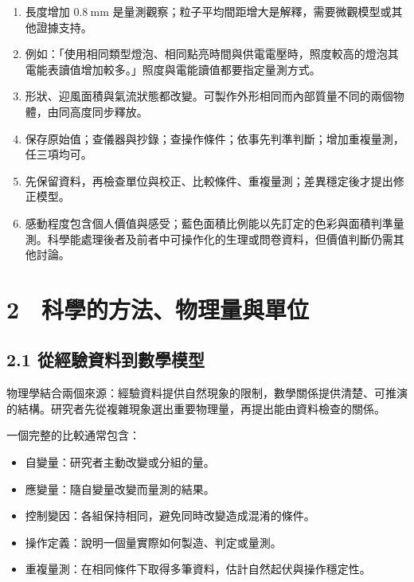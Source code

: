 \documentclass[11pt,a4paper]{article}
\providecommand{\tightlist}{%
  \setlength{\itemsep}{0pt}\setlength{\parskip}{0pt}}
\begin{document}
\begin{enumerate}
\def\labelenumi{\arabic{enumi}.}
\tightlist
\item
  長度增加 \(0.8\ \mathrm{mm}\) 是量測觀察；粒子平均間距增大是解釋，需要微觀模型或其他證據支持。
\item
  例如：「使用相同類型燈泡、相同點亮時間與供電電壓時，照度較高的燈泡其電能表讀值增加較多。」照度與電能讀值都要指定量測方式。
\item
  形狀、迎風面積與氣流狀態都改變。可製作外形相同而內部質量不同的兩個物體，由同高度同步釋放。
\item
  保存原始值；查儀器與抄錄；查操作條件；依事先判準判斷；增加重複量測，任三項均可。
\item
  先保留資料，再檢查單位與校正、比較條件、重複量測；差異穩定後才提出修正模型。
\item
  感動程度包含個人價值與感受；藍色面積比例能以先訂定的色彩與面積判準量測。科學能處理後者及前者中可操作化的生理或問卷資料，但價值判斷仍需其他討論。
\end{enumerate}

\section{2　科學的方法、物理量與單位}\label{ux79d1ux5b78ux7684ux65b9ux6cd5ux7269ux7406ux91cfux8207ux55aeux4f4d}

\subsection{2.1 從經驗資料到數學模型}\label{ux5f9eux7d93ux9a57ux8cc7ux6599ux5230ux6578ux5b78ux6a21ux578b}

物理學結合兩個來源：經驗資料提供自然現象的限制，數學關係提供清楚、可推演的結構。研究者先從複雜現象選出重要物理量，再提出能由資料檢查的關係。

一個完整的比較通常包含：

\begin{itemize}
\tightlist
\item
  自變量：研究者主動改變或分組的量。
\item
  應變量：隨自變量改變而量測的結果。
\item
  控制變因：各組保持相同，避免同時改變造成混淆的條件。
\item
  操作定義：說明一個量實際如何製造、判定或量測。
\item
  重複量測：在相同條件下取得多筆資料，估計自然起伏與操作穩定性。
\end{itemize}
\end{document}
